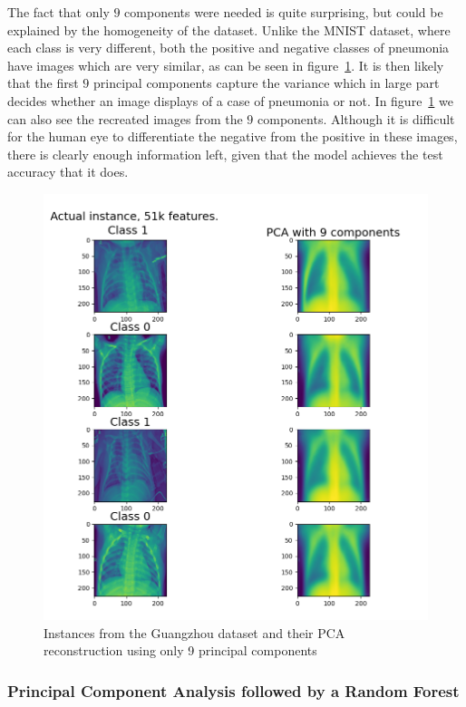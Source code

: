 \documentclass[onecolumn,10pt,cleanfoot]{asme2ej}
\begin{document}
The fact that only $9$ components were needed is quite surprising, but could be explained by the homogeneity of the dataset. Unlike the MNIST dataset, where each class is very different, both the positive and negative classes of pneumonia have images which are very similar, as can be seen in figure~\ref{pneupcacomp}. It is then likely that the first $9$ principal components capture the variance which in large part decides whether an image displays of a case of pneumonia or not. In figure~\ref{pneupcacomp} we can also see the recreated images from the $9$ components. Although it is difficult for the human eye to differentiate the negative from the positive in these images, there is clearly enough information left, given that the model achieves the test accuracy that it does.

\begin{figure}[H]
\centerline{\includegraphics[width=6in]{figure/pneupcacomp.png}}
\caption{Instances from the Guangzhou dataset and their PCA reconstruction using only 9 principal components}
\label{pneupcacomp}
\end{figure}

\subsubsection{Principal Component Analysis followed by a Random Forest}
\end{document}
